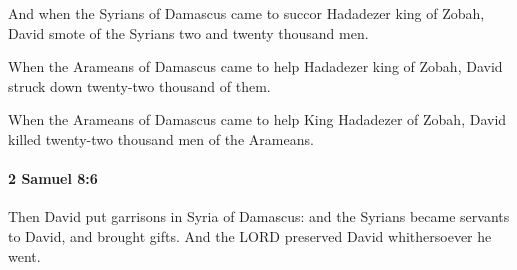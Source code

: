 			\begin{versebox}
					\item[BHS] 
					\item[ASV] And when the Syrians of Damascus came to succor Hadadezer king of Zobah, David smote of the Syrians two and twenty thousand men.
					\item[NIV] When the Arameans of Damascus came to help Hadadezer king of Zobah, David struck down twenty-two thousand of them.
					\item[NRSV] When the Arameans of Damascus came to help King Hadadezer of Zobah, David killed twenty-two thousand men of the Arameans.
			\end{versebox}

		\paragraph{2 Samuel 8:6} %
			\label{2SAMUEL-8-6}

			Then David put garrisons in Syria of Damascus: and the Syrians became servants to David, and brought gifts. And the LORD preserved David whithersoever he went.

